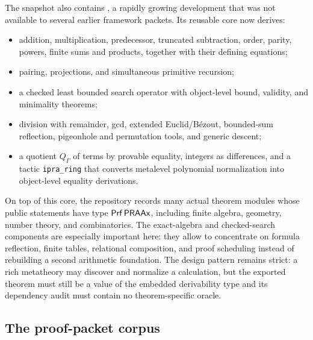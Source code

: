 The snapshot also contains , a rapidly growing development that was not available to several earlier framework packets.  Its reusable core now derives:
\begin{itemize}
  \item addition, multiplication, predecessor, truncated subtraction, order, parity, powers, finite sums and products, together with their defining equations;
  \item pairing, projections, and simultaneous primitive recursion;
  \item a checked least bounded search operator with object-level bound, validity, and minimality theorems;
  \item division with remainder, gcd, extended Euclid/B\'ezout, bounded-sum reflection, pigeonhole and permutation tools, and generic descent;
  \item a quotient \(Q_\Gamma\) of terms by provable equality, integers as differences, and a tactic \texttt{ipra\_ring} that converts metalevel polynomial normalization into object-level equality derivations.
\end{itemize}
On top of this core, the repository records many actual theorem modules whose public statements have type \(\mathsf{Prf}\,\mathsf{PRAAx}\), including finite algebra, geometry, number theory, and combinatorics.  The exact-algebra and checked-search components are especially important here: they allow \KIFC to concentrate on formula reflection, finite tables, relational composition, and proof scheduling instead of rebuilding a second arithmetic foundation.  The design pattern remains strict: a rich metatheory may discover and normalize a calculation, but the exported theorem must still be a value of the embedded derivability type and its dependency audit must contain no theorem-specific oracle.

\subsection{The proof-packet corpus}

